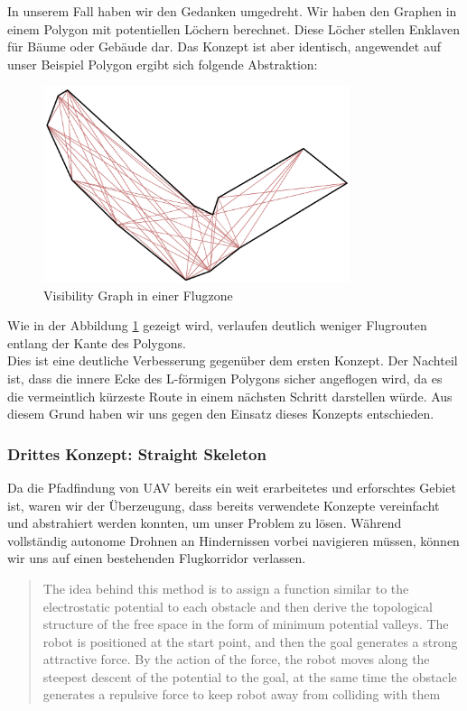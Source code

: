 In unserem Fall haben wir den Gedanken umgedreht. Wir haben den Graphen in einem Polygon mit potentiellen Löchern berechnet. Diese Löcher stellen Enklaven für Bäume oder Gebäude dar. Das Konzept ist aber identisch, angewendet auf unser Beispiel Polygon ergibt sich folgende Abstraktion:
\begin{figure}[H]
	\centering
	\includegraphics[width=0.8\textwidth]{images/routing/visibilityGraph.png}
	\caption{Visibility Graph in einer Flugzone}
	\label{fig:visibility-graph}
\end{figure}
Wie in der Abbildung \ref{fig:visibility-graph} gezeigt wird, verlaufen deutlich weniger Flugrouten entlang der Kante des Polygons. \\
Dies ist eine deutliche Verbesserung gegenüber dem ersten Konzept. Der Nachteil ist, dass die innere Ecke des L-förmigen Polygons sicher angeflogen wird, da es die vermeintlich kürzeste Route in einem nächsten Schritt darstellen würde. Aus diesem Grund haben wir uns gegen den Einsatz dieses Konzepts entschieden.\\

\subsubsection{Drittes Konzept: Straight Skeleton}
Da die Pfadfindung von \Gls{UAV} bereits ein weit erarbeitetes und erforschtes Gebiet ist, waren wir der Überzeugung, dass bereits verwendete Konzepte vereinfacht und abstrahiert werden konnten, um unser Problem zu lösen. Während vollständig autonome Drohnen an Hindernissen vorbei navigieren müssen, können wir uns auf einen bestehenden Flugkorridor verlassen.
\blockquote{The idea behind this method is to assign a function similar to the electrostatic potential to each obstacle and then derive the topological structure of the free space in the form of minimum potential valleys. The robot is positioned at the start point, and then the goal generates a strong attractive force. By the action of the force, the robot moves along the steepest descent of the potential to the goal, at the same time the obstacle generates a repulsive force to keep robot away from colliding with them} 

